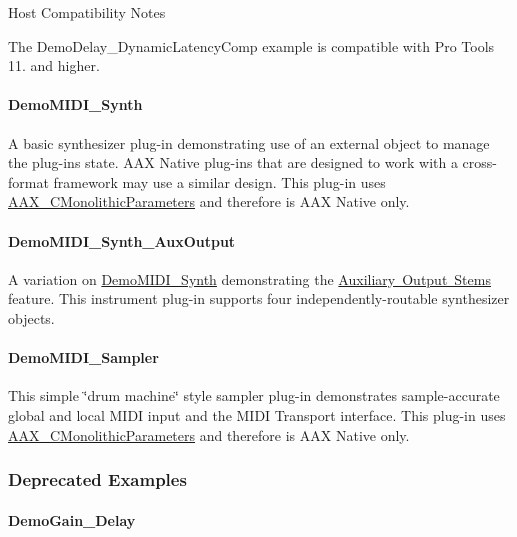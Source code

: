 \begin{DoxyRefDesc}{Host Compatibility Notes}
\item[\mbox{\hyperlink{a00786__compatibility_notes000011}{Host Compatibility Notes}}]The Demo\+Delay\+\_\+\+Dynamic\+Latency\+Comp example is compatible with Pro Tools 11. and higher.\end{DoxyRefDesc}
\hypertarget{a00848_DemoMIDI_Synth}{}\paragraph{Demo\+M\+I\+D\+I\+\_\+\+Synth}\label{a00848_DemoMIDI_Synth}
A basic synthesizer plug-\/in demonstrating use of an external object to manage the plug-\/in\textquotesingle{}s state. A\+AX Native plug-\/ins that are designed to work with a cross-\/format framework may use a similar design. This plug-\/in uses \mbox{\hyperlink{a01969}{A\+A\+X\+\_\+\+C\+Monolithic\+Parameters}} and therefore is A\+AX Native only.\hypertarget{a00848_DemoMIDI_Synth_AuxOutput}{}\paragraph{Demo\+M\+I\+D\+I\+\_\+\+Synth\+\_\+\+Aux\+Output}\label{a00848_DemoMIDI_Synth_AuxOutput}
A variation on \mbox{\hyperlink{a00848_DemoMIDI_Synth}{Demo\+M\+I\+D\+I\+\_\+\+Synth}} demonstrating the \mbox{\hyperlink{a00809}{Auxiliary Output Stems}} feature. This instrument plug-\/in supports four independently-\/routable synthesizer objects.\hypertarget{a00848_DemoMIDI_Sampler}{}\paragraph{Demo\+M\+I\+D\+I\+\_\+\+Sampler}\label{a00848_DemoMIDI_Sampler}
This simple \char`\"{}drum machine\char`\"{} style sampler plug-\/in demonstrates sample-\/accurate global and local M\+I\+DI input and the M\+I\+DI Transport interface. This plug-\/in uses \mbox{\hyperlink{a01969}{A\+A\+X\+\_\+\+C\+Monolithic\+Parameters}} and therefore is A\+AX Native only.\hypertarget{a00848_deprecated_examples}{}\subsubsection{Deprecated Examples}\label{a00848_deprecated_examples}
\hypertarget{a00848_DemoGain_Delay}{}\paragraph{Demo\+Gain\+\_\+\+Delay}\label{a00848_DemoGain_Delay}
